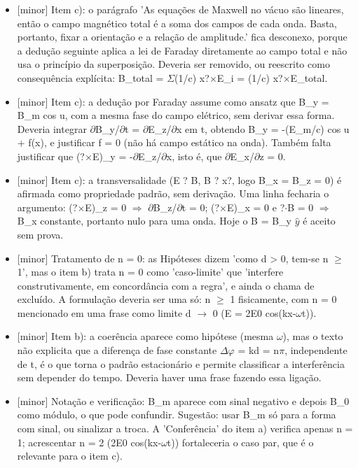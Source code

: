 \documentclass{article}%
\begin{document}
\begin{itemize}%
\item%
{[}minor{]} Item c): o parágrafo 'As equações de Maxwell no vácuo são lineares, então o campo magnético total é a soma dos campos de cada onda. Basta, portanto, fixar a orientação e a relação de amplitude.' fica desconexo, porque a dedução seguinte aplica a lei de Faraday diretamente ao campo total e não usa o princípio da superposição. Deveria ser removido, ou reescrito como consequência explícita: B\_total = $\Sigma$(1/c) x?$\times$E\_i = (1/c) x?$\times$E\_total.%
\item%
{[}minor{]} Item c): a dedução por Faraday assume como ansatz que B\_y = B\_m cos u, com a mesma fase do campo elétrico, sem derivar essa forma. Deveria integrar $\partial$B\_y/$\partial$t = $\partial$E\_z/$\partial$x em t, obtendo B\_y = -(E\_m/c) cos u + f(x), e justificar f = 0 (não há campo estático na onda). Também falta justificar que (?$\times$E)\_y = -$\partial$E\_z/$\partial$x, isto é, que $\partial$E\_x/$\partial$z = 0.%
\item%
{[}minor{]} Item c): a transversalidade (E ? B, B ? x?, logo B\_x = B\_z = 0) é afirmada como propriedade padrão, sem derivação. Uma linha fecharia o argumento: (?$\times$E)\_z = 0 $\Rightarrow$ $\partial$B\_z/$\partial$t = 0; (?$\times$E)\_x = 0 e ?$\cdot$B = 0 $\Rightarrow$ B\_x constante, portanto nulo para uma onda. Hoje o B = B\_y $\hat y$ é aceito sem prova.%
\item%
{[}minor{]} Tratamento de n = 0: as Hipóteses dizem 'como d > 0, tem{-}se n $\geq$ 1', mas o item b) trata n = 0 como 'caso{-}limite' que 'interfere construtivamente, em concordância com a regra', e ainda o chama de excluído. A formulação deveria ser uma só: n $\geq$ 1 fisicamente, com n = 0 mencionado em uma frase como limite d $\to$ 0 (E = 2E0 cos(kx-$\omega$t)).%
\item%
{[}minor{]} Item b): a coerência aparece como hipótese (mesma $\omega$), mas o texto não explicita que a diferença de fase constante $\Delta$$\varphi$ = kd = n$\pi$, independente de t, é o que torna o padrão estacionário e permite classificar a interferência sem depender do tempo. Deveria haver uma frase fazendo essa ligação.%
\item%
{[}minor{]} Notação e verificação: B\_m aparece com sinal negativo e depois B\_0 como módulo, o que pode confundir. Sugestão: usar B\_m só para a forma com sinal, ou sinalizar a troca. A 'Conferência' do item a) verifica apenas n = 1; acrescentar n = 2 (2E0 cos(kx-$\omega$t)) fortaleceria o caso par, que é o relevante para o item c).%
\end{itemize}%
\end{document}
